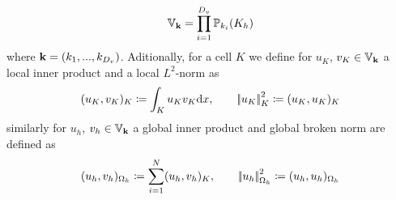 \begin{equation}
	\mathbb{V}_{\textbf{k}} = \prod_{i=1}^{D_v} \mathbb{P}_{k_i}(K_h)
	\label{Eq:Vspace}
\end{equation}
where $\textbf{k} = \left(k_1,...,k_{D_v}\right)$. 
Aditionally, for a cell $K$ we define for $u_K$, $v_K\in \mathbb{V}_{\textbf{k}}$ a local inner product and a local $L^2$-norm as
\begin{equation}
(u_K, v_K)_K \coloneqq \int_K u_K v_K\text{d}x, \qquad \left|\!\left| {u_K} \right|\!\right|^2_K \coloneqq(u_K,u_K)_K
\end{equation}
similarly for $u_h$, $v_h \in \mathbb{V}_{\textbf{k}}$ a global inner product and global broken norm are defined as
\begin{equation}
	(u_h, v_h)_{\Omega_h} \coloneqq \sum_{i = 1}^N (u_h, v_h)_K, \qquad \left|\!\left| {u_h} \right|\!\right|^2_{\Omega_h} \coloneqq(u_h,u_h)_{\Omega_h}
\end{equation}
